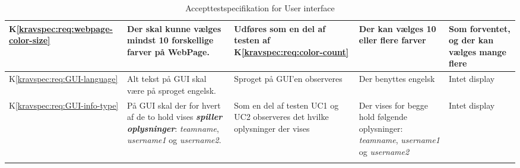 \documentclass[Accepttestspecifikation/Accepttest_Main.tex]{subfiles}
\begin{document}
\begin{longtable}{|L{0.08\textwidth}|L{0.3\textwidth}|L{0.3\textwidth}|L{0.2\textwidth}|L{0.2\textwidth}|}
K\ref{kravspec:req:webpage-color-size} & Der skal kunne vælges mindst 10 forskellige farver på WebPage. & Udføres som en del af testen af K\ref{kravspec:req:color-count} & Der kan vælges 10 eller flere farver & Som forventet, og der kan vælges mange flere\\ \hline
K\ref{kravspec:req:GUI-language} & Alt tekst på GUI skal være på sproget engelsk. & Sproget på GUI'en observeres & Der benyttes engelsk &  Intet display\\ \hline
K\ref{kravspec:req:GUI-info-type} & På GUI skal der for hvert af de to hold vises \textit{\textbf{spiller oplysninger}}: \textit{teamname}, \textit{username1} og \textit{username2}. & Som en del af testen UC1 og UC2 observeres det hvilke oplysninger der vises & Der vises for begge hold følgende oplysninger: \textit{teamname}, \textit{username1} og \textit{username2}& Intet display \\ \hline


\caption{Accepttestspecifikation for User interface}
\label{tab:IkkeFunktUI}
\end{longtable}
\end{document}
